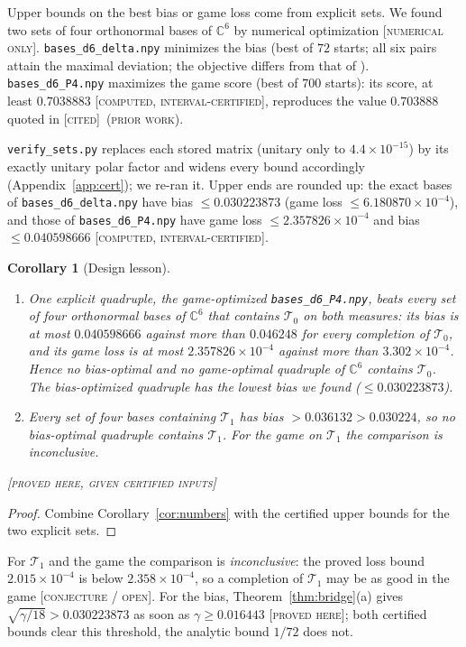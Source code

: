 \documentclass[11pt]{article}
\newcommand{\C}{\mathbb{C}}
\newcommand{\Tz}{\mathcal{T}_0}          %
\newcommand{\To}{\mathcal{T}_1}          %
\newcommand{\st}[1]{\textsc{[#1]}}
\newcommand{\stproved}{\st{proved here}}
\newcommand{\stgiven}{\st{proved here, given certified inputs}}
\newcommand{\stcert}{\st{computed, interval-certified}}
\newcommand{\stnum}{\st{numerical only}}
\newcommand{\stcited}{\st{cited}}
\newcommand{\stconj}{\st{conjecture / open}}
\newcommand{\prior}{\textsc{(prior work)}}
\newtheorem{corollary}[theorem]{Corollary}
\theoremstyle{definition}
\theoremstyle{remark}
\begin{document}
Upper bounds on the best bias or game loss come from explicit sets. We found two sets of four
orthonormal bases of $\C^6$ by numerical optimization \stnum. \texttt{bases\_d6\_delta.npy} minimizes the bias (best
of $72$ starts; all six pairs attain the maximal deviation; the objective differs from that of \cite{RLE}). \texttt{bases\_d6\_P4.npy} maximizes the game score
(best of $700$ starts): its score, at least $0.7038883$ \stcert, reproduces the value
$0.703888$ quoted in \cite{MWreview} \stcited\ \prior.

\texttt{verify\_sets.py} replaces each stored matrix (unitary only to $4.4\times10^{-15}$) by its exactly unitary polar
factor and widens every bound accordingly (Appendix~\ref{app:cert}); we re-ran it. Upper ends are rounded up:
the exact bases of \texttt{bases\_d6\_delta.npy} have bias $\le0.030223873$ (game loss $\le6.180870\times10^{-4}$), and
those of \texttt{bases\_d6\_P4.npy} have game loss $\le2.357826\times10^{-4}$ and bias $\le0.040598666$ \stcert.

\begin{corollary}[Design lesson]\label{cor:design}
\begin{enumerate}[label=(\alph*)]
\item One explicit quadruple, the game-optimized \texttt{bases\_d6\_P4.npy}, beats every set of four orthonormal bases
      of $\C^6$ that contains $\Tz$ on both measures: its bias is at most $0.040598666$ against more than $0.046248$ for
      every completion of $\Tz$, and its game loss is at most $2.357826\times10^{-4}$ against more than
      $3.302\times10^{-4}$. Hence no bias-optimal and no game-optimal quadruple of $\C^6$ contains $\Tz$. The bias-optimized
      quadruple has the lowest bias we found ($\le0.030223873$).
\item Every set of four bases containing $\To$ has bias $>0.036132>0.030224$, so no bias-optimal quadruple contains
      $\To$. For the game on $\To$ the comparison is inconclusive.
\end{enumerate}
\stgiven
\end{corollary}
\begin{proof}Combine Corollary~\ref{cor:numbers} with the certified upper bounds for the two explicit sets.\end{proof}

For $\To$ and the game the comparison is \emph{inconclusive}: the proved loss bound $2.015\times10^{-4}$ is below
$2.358\times10^{-4}$, so a completion of $\To$ may be as good in the game \stconj. For the bias,
Theorem~\ref{thm:bridge}(a) gives $\sqrt{\gamma/18}>0.030223873$ as soon as $\gamma\ge0.016443$ \stproved; both certified bounds clear this threshold, the analytic bound $1/72$ does not.
\end{document}
